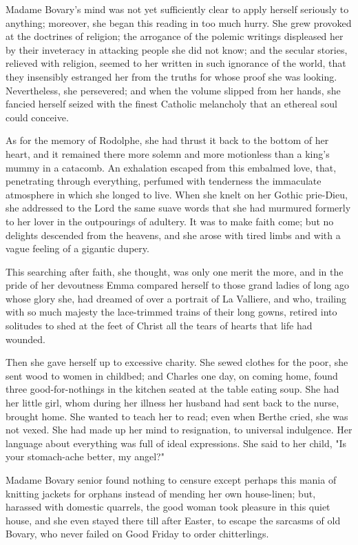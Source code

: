 \documentclass[11pt,twocolumn]{ltugboat}
\begin{document}
Madame Bovary's mind was not yet sufficiently clear to apply herself
seriously to anything; moreover, she began this reading in too much
hurry. She grew provoked at the doctrines of religion; the arrogance
of the polemic writings displeased her by their inveteracy in attacking
people she did not know; and the secular stories, relieved with
religion, seemed to her written in such ignorance of the world, that
they insensibly estranged her from the truths for whose proof she was
looking. Nevertheless, she persevered; and when the volume slipped
from her hands, she fancied herself seized with the finest Catholic
melancholy that an ethereal soul could conceive.

As for the memory of Rodolphe, she had thrust it back to the bottom of
her heart, and it remained there more solemn and more motionless than
a king's mummy in a catacomb. An exhalation escaped from this embalmed
love, that, penetrating through everything, perfumed with tenderness the
immaculate atmosphere in which she longed to live. When she knelt on her
Gothic prie-Dieu, she addressed to the Lord the same suave words that
she had murmured formerly to her lover in the outpourings of adultery.
It was to make faith come; but no delights descended from the heavens,
and she arose with tired limbs and with a vague feeling of a gigantic
dupery.

This searching after faith, she thought, was only one merit the more,
and in the pride of her devoutness Emma compared herself to those grand
ladies of long ago whose glory she, had dreamed of over a portrait of La
Valliere, and who, trailing with so much majesty the lace-trimmed trains
of their long gowns, retired into solitudes to shed at the feet of
Christ all the tears of hearts that life had wounded.

Then she gave herself up to excessive charity. She sewed clothes for the
poor, she sent wood to women in childbed; and Charles one day, on coming
home, found three good-for-nothings in the kitchen seated at the table
eating soup. She had her little girl, whom during her illness her
husband had sent back to the nurse, brought home. She wanted to teach
her to read; even when Berthe cried, she was not vexed. She had made
up her mind to resignation, to universal indulgence. Her language about
everything was full of ideal expressions. She said to her child, "Is
your stomach-ache better, my angel?"

Madame Bovary senior found nothing to censure except perhaps this mania
of knitting jackets for orphans instead of mending her own house-linen;
but, harassed with domestic quarrels, the good woman took pleasure in
this quiet house, and she even stayed there till after Easter, to escape
the sarcasms of old Bovary, who never failed on Good Friday to order
chitterlings.
\end{document}
